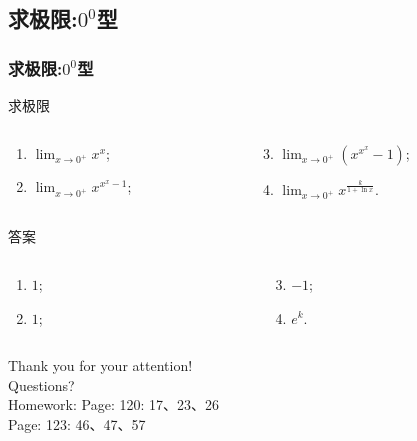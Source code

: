 \documentclass[
10pt,
aspectratio=43,
]{beamer}
\begin{document}
\subsection{求极限:$\displaystyle0^0$型}
\begin{frame}
	\frametitle{求极限:$\displaystyle0^0$型}
	\everymath{\displaystyle}
	\begin{block}{求极限}
		\begin{columns}[t]
			\begin{column}{0.5\textwidth}
				\begin{enumerate}
					\item $\lim _{x \rightarrow 0^+} x^x$;
					\item $\lim _{x \rightarrow 0^+} x^{x^x-1}$;
				\end{enumerate}
			\end{column}
			\begin{column}{0.5\textwidth}
				\begin{enumerate}
					\setcounter{enumi}{2}
					\item $\lim _{x \rightarrow 0^+}\left(x^{x^x}-1\right)$;
					\item $\lim _{x \rightarrow 0^+} x^{\frac{k}{1+\ln x}}$.
				\end{enumerate}
			\end{column}
		\end{columns}
	\end{block}

	\begin{exampleblock}{答案}
		\begin{columns}[t]
			\begin{column}{0.5\textwidth}
				\begin{enumerate}
					\pause
					\item $1$;
					\item $1$;
				\end{enumerate}
			\end{column}
			\begin{column}{0.5\textwidth}
				\begin{enumerate}
					\setcounter{enumi}{2}
					\pause
					\item $-1$;
					\item $e^{k}$.
				\end{enumerate}
			\end{column}
		\end{columns}
	\end{exampleblock}
\end{frame}




\begin{frame}[plain]
	\vfill
	\centering
	{
		\centering \Huge \color{white} Thank you for your attention!\\[10pt]Questions?\\Homework: Page: 120: 17、23、26\\\vspace{0.4cm}Page: 123:  46、47、57
	}
	\vfill
\end{frame}
\end{document}
